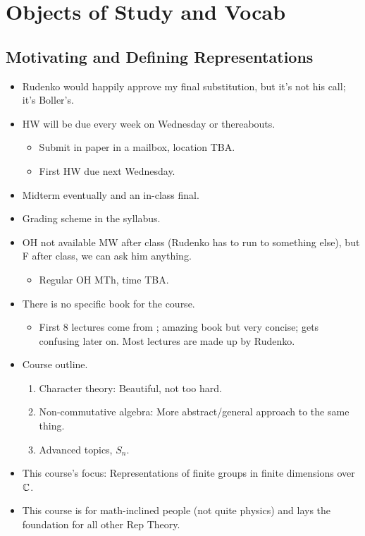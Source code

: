 \documentclass[../notes.tex]{subfiles}
\begin{document}
\chapter{Objects of Study and Vocab}
\section{Motivating and Defining Representations}
\begin{itemize}
    \item {}Rudenko would happily approve my final substitution, but it's not his call; it's Boller's.
    \item HW will be due every week on Wednesday or thereabouts.
    \begin{itemize}
        \item Submit in paper in a mailbox, location TBA.
        \item First HW due next Wednesday.
    \end{itemize}
    \item Midterm eventually and an in-class final.
    \item Grading scheme in the syllabus.
    \item OH not available MW after class (Rudenko has to run to something else), but F after class, we can ask him anything.
    \begin{itemize}
        \item Regular OH MTh, time TBA.
    \end{itemize}
    \item There is no specific book for the course.
    \begin{itemize}
        \item First 8 lectures come from \textcite{bib:Serre}; amazing book but very concise; gets confusing later on. Most lectures are made up by Rudenko.
    \end{itemize}
    \item Course outline.
    \begin{enumerate}
        \item Character theory: Beautiful, not too hard.
        \item Non-commutative algebra: More abstract/general approach to the same thing.
        \item Advanced topics, $S_n$.
    \end{enumerate}
    \item This course's focus: Representations of finite groups in finite dimensions over $\mathbb{C}$.
    \item This course is for math-inclined people (not quite physics) and lays the foundation for all other Rep Theory.

\end{itemize}
\end{document}

